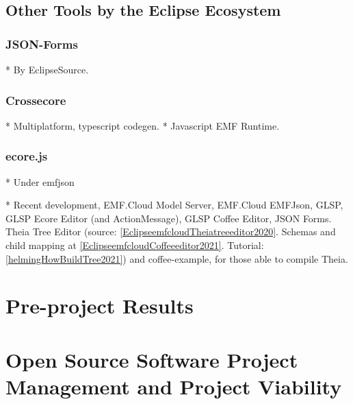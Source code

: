 \subsection{Other Tools by the Eclipse Ecosystem}

\subsubsection{JSON-Forms}\label{sec:json-forms}
* By EclipseSource.

\subsubsection{Crossecore}
* Multiplatform, typescript codegen.
* Javascript EMF Runtime.

\subsubsection{ecore.js}
* Under emfjson

* Recent development, EMF.Cloud Model Server, EMF.Cloud EMFJson, GLSP, GLSP Ecore Editor (and ActionMessage\label{par:glsp-actionmessage}), GLSP Coffee Editor, JSON Forms.
Theia Tree Editor\label{par:theia-tree-editor} (source: \cref{EclipseemfcloudTheiatreeeditor2020}. Schemas and child mapping at \cref{EclipseemfcloudCoffeeeditor2021}. Tutorial: \cref{helmingHowBuildTree2021}) and coffee-example, for those able to compile Theia.

\section{Pre-project Results}




\section{Open Source Software Project Management and Project Viability}

